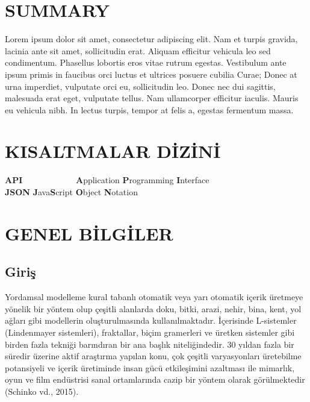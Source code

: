 \documentclass[12pt,turkish,a4paperpaper,]{report}
\begin{document}
\hypertarget{summary}{%
\chapter*{SUMMARY}\label{summary}}

Lorem ipsum dolor sit amet, consectetur adipiscing elit. Nam et turpis
gravida, lacinia ante sit amet, sollicitudin erat. Aliquam efficitur
vehicula leo sed condimentum. Phasellus lobortis eros vitae rutrum
egestas. Vestibulum ante ipsum primis in faucibus orci luctus et
ultrices posuere cubilia Curae; Donec at urna imperdiet, vulputate orci
eu, sollicitudin leo. Donec nec dui sagittis, malesuada erat eget,
vulputate tellus. Nam ullamcorper efficitur iaculis. Mauris eu vehicula
nibh. In lectus turpis, tempor at felis a, egestas fermentum massa.
\newpage {} \listoffigures

\newpage{}\listoftables{}

\hypertarget{kisaltmalar-dizini}{%
\chapter*{KISALTMALAR DİZİNİ}\label{kisaltmalar-dizini}}

\begin{tabbing}
\textbf{API}~~~~~~~~~~~~ \= \textbf{A}pplication \textbf{P}rogramming \textbf{I}nterface \\  
\textbf{JSON} \> \textbf{J}ava\textbf{S}cript \textbf{O}bject \textbf{N}otation \\  
\end{tabbing}

\hypertarget{genel-bilgiler}{%
\chapter{GENEL BİLGİLER}\label{genel-bilgiler}}

\pagestyle{main}\thispagestyle{empty}

\hypertarget{giriux15f}{%
\section{Giriş}\label{giriux15f}}

Yordamsal modelleme kural tabanlı otomatik veya yarı otomatik içerik
üretmeye yönelik bir yöntem olup çeşitli alanlarda doku, bitki, arazi,
nehir, bina, kent, yol ağları gibi modellerin oluşturulmasında
kullanılmaktadır. İçerisinde L-sistemler (Lindenmayer sistemleri),
fraktallar, biçim gramerleri ve üretken sistemler gibi birden fazla
tekniği barındıran bir ana başlık niteliğindedir. 30 yıldan fazla bir
süredir üzerine aktif araştırma yapılan konu, çok çeşitli varyasyonları
üretebilme potansiyeli ve içerik üretiminde insan gücü etkileşimini
azaltması ile mimarlık, oyun ve film endüstrisi sanal ortamlarında cazip
bir yöntem olarak görülmektedir (Schinko vd., 2015).
\end{document}
